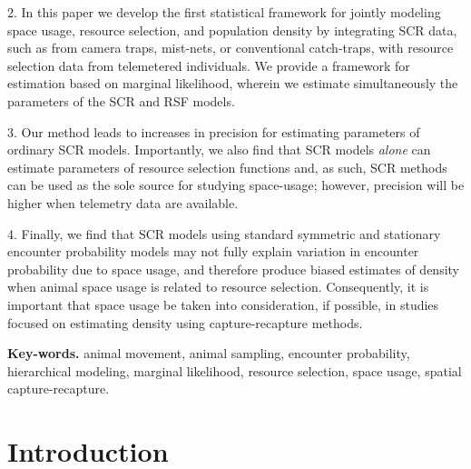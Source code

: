 \documentclass[12pt]{article}
\begin{document}
2. In this paper we develop the first statistical framework for
jointly modeling space usage, resource selection, and population
density by integrating SCR data, such as from camera traps, mist-nets, or
conventional catch-traps, with resource selection data from telemetered individuals.
We provide a framework for estimation based on marginal
likelihood, wherein we estimate simultaneously the parameters of the
SCR and RSF models.

3.
Our method leads to increases in precision
for estimating %
parameters of ordinary
SCR models.  Importantly, we also find that SCR models {\it alone} can
estimate parameters of resource selection functions and, as such, SCR
methods can be used as the sole source for studying space-usage;
however, precision will be higher when telemetry data are available.

4. Finally, we find that SCR
models using standard symmetric and stationary encounter probability
models may not fully explain variation in encounter probability due to
space usage, and therefore produce biased estimates of density when animal space
usage is related to resource selection. %
Consequently, it is
important that space usage be taken into consideration, if
possible, in studies focused on estimating density using
capture-recapture methods.

\vspace{.2in}

{\bf Key-words. }
animal movement, animal sampling, encounter
probability, hierarchical modeling,
marginal likelihood,
resource selection, space usage,  spatial capture-recapture. \\


\section{Introduction}
\end{document}
